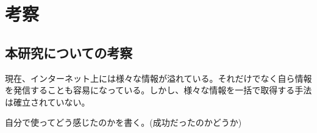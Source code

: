 \chapter{考察}
\label{chap:consideration}

\section{本研究についての考察}
現在、インターネット上には様々な情報が溢れている。それだけでなく自ら情報を発信することも容易になっている。しかし、様々な情報を一括で取得する手法は確立されていない。

自分で使ってどう感じたのかを書く。(成功だったのかどうか)
